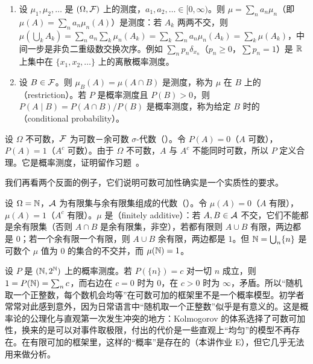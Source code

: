 \begin{example}[测度的非负线性组合与限制]\label{ex:measures:combination}
\begin{enumerate}
\item 设 $\mu_1,\mu_2,\dots$ 是 $(\Omega,\mathcal{F})$ 上的测度，$a_1,a_2,\dots\in[0,\infty)$。则 $\mu=\sum_na_n\mu_n$（即 $\mu(A)=\sum_na_n\mu_n(A)$）是测度：若 $A_k$ 两两不交，则 $\mu(\bigcup_kA_k)=\sum_na_n\sum_k\mu_n(A_k)=\sum_k\sum_na_n\mu_n(A_k)=\sum_k\mu(A_k)$，中间一步是非负二重级数交换次序。例如 $\sum_np_n\delta_{x_n}$（$p_n\geqslant0$，$\sum p_n=1$）是 $\mathbb{R}$ 上集中在 $\{x_1,x_2,\dots\}$ 上的离散概率测度。
\item 设 $B\in\mathcal{F}$。则 $\mu_B(A)=\mu(A\cap B)$ 是测度，称为 $\mu$ 在 $B$ 上的（restriction）。若 $P$ 是概率测度且 $P(B)>0$，则 $P(A\mid B)=P(A\cap B)/P(B)$ 是概率测度，称为给定 $B$ 时的（conditional probability）。
\end{enumerate}
\end{example}

\begin{example}[$0$-$1$ 测度]\label{ex:measures:zero-one}
设 $\Omega$ 不可数，$\mathcal{F}$ 为可数－余可数 $\sigma$-代数（）。令 $P(A)=0$（$A$ 可数），$P(A)=1$（$A^c$ 可数）。由于 $\Omega$ 不可数，$A$ 与 $A^c$ 不能同时可数，所以 $P$ 定义合理。它是概率测度，证明留作习题~。
\end{example}

我们再看两个反面的例子，它们说明可数可加性确实是一个实质性的要求。

\begin{example}[有限可加但不可数可加]\label{ex:measures:finitely-additive}
设 $\Omega=\mathbb{N}$，$\mathcal{A}$ 为有限集与余有限集组成的代数（）。令 $\mu(A)=0$（$A$ 有限），$\mu(A)=1$（$A^c$ 有限）。$\mu$ 是（finitely additive）：若 $A,B\in\mathcal{A}$ 不交，它们不能都是余有限集（否则 $A\cap B$ 是余有限集，非空），若都有限则 $A\cup B$ 有限，两边都是 $0$；若一个余有限一个有限，则 $A\cup B$ 余有限，两边都是 $1$。但 $\mathbb{N}=\bigcup_n\{n\}$ 是可数个 $\mu$ 值为 $0$ 的集合的不交并，而 $\mu(\mathbb{N})=1$。
\end{example}

\begin{example}
设 $P$ 是 $(\mathbb{N},2^{\mathbb{N}})$ 上的概率测度。若 $P(\{n\})=c$ 对一切 $n$ 成立，则 $1=P(\mathbb{N})=\sum_nc$，而右边在 $c=0$ 时为 $0$，在 $c>0$ 时为 $\infty$，矛盾。所以“随机取一个正整数，每个数机会均等”在可数可加的框架里不是一个概率模型。初学者常常对此感到意外，因为日常语言中“随机取一个正整数”似乎是有意义的。这是概率论的公理化与直观第一次发生冲突的地方：Kolmogorov 的体系选择了可数可加性，换来的是可以对事件取极限，付出的代价是一些直观上“均匀”的模型不再存在。在有限可加的框架里，这样的“概率”是存在的（本讲作业 E），但它几乎无法用来做分析。
\end{example}

